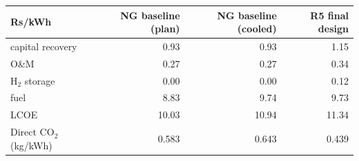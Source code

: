 \begin{tabular}{lrrr}\toprule Rs/kWh & NG baseline (plan) & NG baseline (cooled) & R5 final design\\\midrule
capital recovery & 0.93 & 0.93 & 1.15\\
O\&M & 0.27 & 0.27 & 0.34\\
H$_2$ storage & 0.00 & 0.00 & 0.12\\
fuel & 8.83 & 9.74 & 9.73\\
\midrule LCOE & 10.03 & 10.94 & 11.34\\
Direct CO$_2$ (kg/kWh) & 0.583 & 0.643 & 0.439\\\bottomrule\end{tabular}